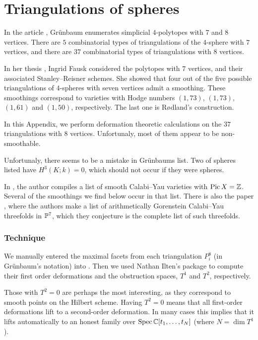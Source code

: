 \chapter{Triangulations of spheres}
\label{sec:spheres8}

In the article \cite{grunbaum_enumeration}, Grünbaum enumerates simplicial $4$-polytopes with $7$ and $8$ vertices. There are $5$ combinatorial types of triangulations of the $4$-sphere with $7$ vertices, and there are $37$ combinatorial types of triangulations with $8$ vertices.

In her thesis \cite{fausk_thesis}, Ingrid Fausk considered the polytopes with $7$ vertices, and their associated Stanley--Reisner schemes. She showed that four out of the five possible triangulations of $4$-spheres with seven vertices admit a smoothing. These smoothings correspond to \CY varieties with Hodge numbers $(1,73)$, $(1,73)$, $(1,61)$ and $(1,50)$, respectively. The last one is Rødland's construction.

In this Appendix, we perform deformation theoretic calculations on the $37$ triangulations with $8$ vertices. Unfortunaly, most of them appear to be non-smoothable.

Unfortunaly, there seems to be a mistake in Grünbaums list.  Two of spheres listed have $H^3(K;k)=0$, which should not occur if they were spheres.

In \cite{kapustka_delpezzo}, the author compiles a list of smooth Calabi--Yau varieties with $\Pic X = \Z$. Several of the smoothings we find below occur in that list. There is also the paper \cite{MR3591944}, where the authors make a list of arithmetically Gorenstein Calabi--Yau threefolds in $\P^7$, which they conjecture is the complete list of such threefolds.

\subsection{Technique}

We manually entered the maximal facets from each triangulation $P_i^8$ (in Grünbaum's notation) into \MM. Then we used Nathan Ilten's package \cite{ilten_versaldeformations} to compute their first order deformations and the obstruction spaces, $T^1$ and $T^2$, respectively.

Those with $T^2=0$ are perhaps the most interesting, as they correspond to smooth points on the Hilbert scheme. Having $T^2=0$ means that all first-order deformations lift to a second-order deformation. In many cases this implies that it lifts automatically to an honest family over $\Spec \C[t_1,\ldots,t_N]$ (where $N=\dim T^1$).

